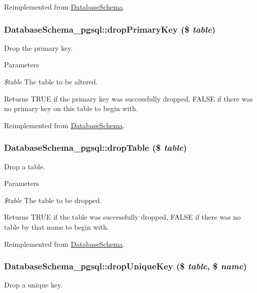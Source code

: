Reimplemented from \hyperlink{classDatabaseSchema_adf5467aa59e462857527d8f1a5988a81}{DatabaseSchema}.\hypertarget{classDatabaseSchema__pgsql_ae1548317341c45c01e0c67f9ebd9a057}{
\subsubsection[{dropPrimaryKey}]{\setlength{\rightskip}{0pt plus 5cm}DatabaseSchema\_\-pgsql::dropPrimaryKey (\$ {\em table})}}
\label{classDatabaseSchema__pgsql_ae1548317341c45c01e0c67f9ebd9a057}
Drop the primary key.


\begin{DoxyParams}{Parameters}
\item[{\em \$table}]The table to be altered.\end{DoxyParams}
\begin{DoxyReturn}{Returns}
TRUE if the primary key was successfully dropped, FALSE if there was no primary key on this table to begin with. 
\end{DoxyReturn}


Reimplemented from \hyperlink{classDatabaseSchema_a08057609758a32c13c4d1863da54b63e}{DatabaseSchema}.\hypertarget{classDatabaseSchema__pgsql_a7d84e7dde7dfcf415b5732eb6f97fbe0}{
\subsubsection[{dropTable}]{\setlength{\rightskip}{0pt plus 5cm}DatabaseSchema\_\-pgsql::dropTable (\$ {\em table})}}
\label{classDatabaseSchema__pgsql_a7d84e7dde7dfcf415b5732eb6f97fbe0}
Drop a table.


\begin{DoxyParams}{Parameters}
\item[{\em \$table}]The table to be dropped.\end{DoxyParams}
\begin{DoxyReturn}{Returns}
TRUE if the table was successfully dropped, FALSE if there was no table by that name to begin with. 
\end{DoxyReturn}


Reimplemented from \hyperlink{classDatabaseSchema_a61a37e713374b88d28161e0ade1a5c78}{DatabaseSchema}.\hypertarget{classDatabaseSchema__pgsql_a1fd8f4f016bf0b242448dc60506ab6cf}{
\subsubsection[{dropUniqueKey}]{\setlength{\rightskip}{0pt plus 5cm}DatabaseSchema\_\-pgsql::dropUniqueKey (\$ {\em table}, \/  \$ {\em name})}}
\label{classDatabaseSchema__pgsql_a1fd8f4f016bf0b242448dc60506ab6cf}
Drop a unique key.


